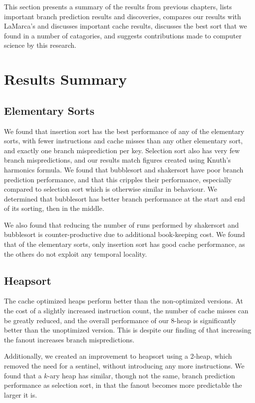 \label{conclusions}
This section presents a summary of the results from previous chapters, lists
important branch prediction results and discoveries, compares our results with
LaMarca's and discusses important cache results, discusses the best sort that we
found in a number of catagories, and suggests contributions made to computer
science by this research.

\section{Results Summary}


\subsection{Elementary Sorts}

We found that insertion sort has the best performance of any of the elementary
sorts, with fewer instructions and cache misses than any other elementary sort,
and exactly one branch misprediction per key. Selection sort also has very few
branch mispredictions, and our results match figures created using Knuth's
harmonics formula. We found that bubblesort and shakersort have poor branch
prediction performance, and that this cripples their performance, especially
compared to selection sort which is otherwise similar in behaviour. We
determined that bubblesort has better branch performance at the start and end of
its sorting, then in the middle.

We also found that reducing the number of runs performed by shakersort and
bubblesort is counter-productive due to additional book-keeping cost. We found
that of the elementary sorts, only insertion sort has good cache performance, as
the others do not exploit any temporal locality.


\subsection{Heapsort}

The cache optimized heaps perform better than the non-optimized versions. At the
cost of a slightly increased instruction count, the number of cache misses can
be greatly reduced, and the overall performance of our 8-heap is significantly
better than the unoptimized version. This is despite our finding of that
increasing the fanout increases branch mispredictions.

Additionally, we created an improvement to heapsort using a 2-heap, which
removed the need for a sentinel, without introducing any more instructions. We
found that a $k$-ary heap has similar, though not the same, branch prediction
performance as selection sort, in that the fanout becomes more predictable the
larger it is.


